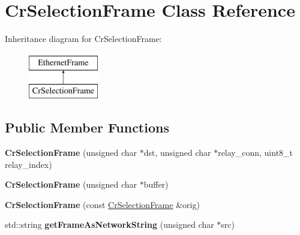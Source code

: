 \hypertarget{classCrSelectionFrame}{\section{Cr\-Selection\-Frame Class Reference}
\label{classCrSelectionFrame}
}
Inheritance diagram for Cr\-Selection\-Frame\-:\begin{figure}[H]
\begin{center}
\leavevmode
\includegraphics[height=2.000000cm]{classCrSelectionFrame}
\end{center}
\end{figure}
\subsection*{Public Member Functions}
\begin{DoxyCompactItemize}
\item 
\hypertarget{classCrSelectionFrame_a7962f610821bc4dfa979c71f763d4124}{{\bfseries Cr\-Selection\-Frame} (unsigned char $\ast$dst, unsigned char $\ast$relay\-\_\-conn, uint8\-\_\-t relay\-\_\-index)}\label{classCrSelectionFrame_a7962f610821bc4dfa979c71f763d4124}

\item 
\hypertarget{classCrSelectionFrame_a5d4f2f16027449976d8f5ccbc5238fff}{{\bfseries Cr\-Selection\-Frame} (unsigned char $\ast$buffer)}\label{classCrSelectionFrame_a5d4f2f16027449976d8f5ccbc5238fff}

\item 
\hypertarget{classCrSelectionFrame_ad70153db877a687540971e5d793e06fb}{{\bfseries Cr\-Selection\-Frame} (const \hyperlink{classCrSelectionFrame}{Cr\-Selection\-Frame} \&orig)}\label{classCrSelectionFrame_ad70153db877a687540971e5d793e06fb}

\item 
\hypertarget{classCrSelectionFrame_a12ed3b4a1d11e164f90d45586e8da971}{std\-::string {\bfseries get\-Frame\-As\-Network\-String} (unsigned char $\ast$src)}\label{classCrSelectionFrame_a12ed3b4a1d11e164f90d45586e8da971}

\end{DoxyCompactItemize}
